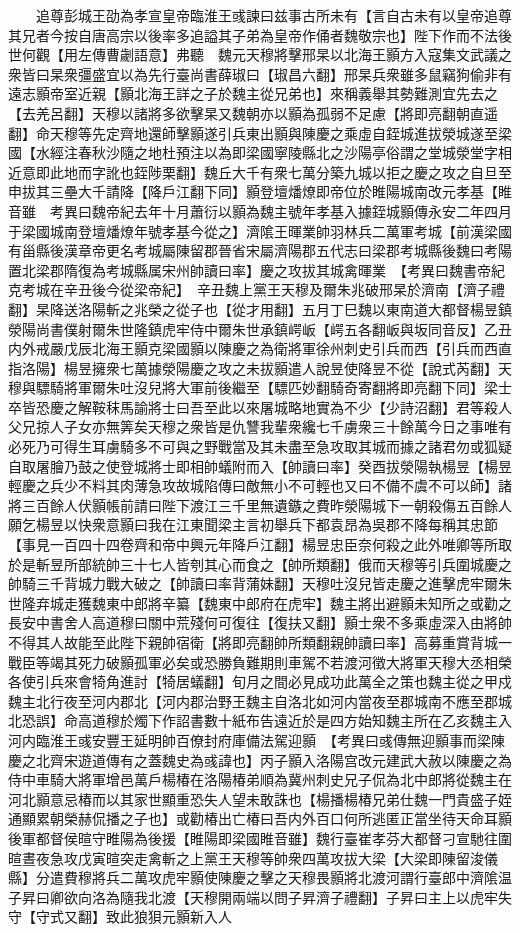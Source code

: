 　　追尊彭城王劭為孝宣皇帝臨淮王彧諫曰兹事古所未有【言自古未有以皇帝追尊其兄者今按自唐高宗以後率多追謚其子弟為皇帝作俑者魏敬宗也】陛下作而不法後世何觀【用左傳曹劌語意】弗聽　魏元天穆將擊邢杲以北海王顥方入寇集文武議之衆皆曰杲衆彊盛宜以為先行臺尚書薛琡曰【琡昌六翻】邢杲兵衆雖多鼠竊狗偷非有遠志顥帝室近親【顥北海王詳之子於魏主從兄弟也】來稱義舉其勢難測宜先去之【去羌呂翻】天穆以諸將多欲擊杲又魏朝亦以顥為孤弱不足慮【將即亮翻朝直遥翻】命天穆等先定齊地還師擊顥遂引兵東出顥與陳慶之乘虛自銍城進拔滎城遂至梁國【水經注春秋沙隨之地杜預注以為即梁國寧陵縣北之沙陽亭俗謂之堂城滎堂字相近意即此地而字訛也銍陟栗翻】魏丘大千有衆七萬分築九城以拒之慶之攻之自旦至申拔其三壘大千請降【降戶江翻下同】顥登壇燔燎即帝位於睢陽城南改元孝基【睢音雖　考異曰魏帝紀去年十月蕭衍以顥為魏主號年孝基入據銍城顥傳永安二年四月于梁國城南登壇燔燎年號孝基今從之】濟隂王暉業帥羽林兵二萬軍考城【前漢梁國有甾縣後漢章帝更名考城屬陳留郡晉省宋屬濟陽郡五代志曰梁郡考城縣後魏曰考陽置北梁郡隋復為考城縣属宋州帥讀曰率】慶之攻拔其城禽暉業　【考異曰魏書帝紀克考城在辛丑後今從梁帝紀】　辛丑魏上黨王天穆及爾朱兆破邢杲於濟南【濟子禮翻】杲降送洛陽斬之兆榮之從子也【從才用翻】五月丁巳魏以東南道大都督楊昱鎮滎陽尚書僕射爾朱世隆鎮虎牢侍中爾朱世承鎮崿岅【崿五各翻岅與坂同音反】乙丑内外戒嚴戊辰北海王顥克梁國顥以陳慶之為衛將軍徐州刺史引兵而西【引兵而西直指洛陽】楊昱擁衆七萬據滎陽慶之攻之未拔顥遣人說昱使降昱不從【說式芮翻】天穆與驃騎將軍爾朱吐沒兒將大軍前後繼至【驃匹妙翻騎奇寄翻將即亮翻下同】梁士卒皆恐慶之解鞍秣馬諭將士曰吾至此以來屠城略地實為不少【少詩沼翻】君等殺人父兄掠人子女亦無筭矣天穆之衆皆是仇讐我輩衆纔七千虜衆三十餘萬今日之事唯有必死乃可得生耳虜騎多不可與之野戰當及其未盡至急攻取其城而據之諸君勿或狐疑自取屠膾乃鼓之使登城將士即相帥蟻附而入【帥讀曰率】癸酉拔滎陽執楊昱【楊昱輕慶之兵少不料其肉薄急攻故城陷傳曰敵無小不可輕也又曰不備不虞不可以師】諸將三百餘人伏顥帳前請曰陛下渡江三千里無遺鏃之費昨滎陽城下一朝殺傷五百餘人願乞楊昱以快衆意顥曰我在江東聞梁主言初舉兵下都袁昂為吳郡不降每稱其忠節【事見一百四十四卷齊和帝中興元年降戶江翻】楊昱忠臣奈何殺之此外唯卿等所取於是斬昱所部統帥三十七人皆刳其心而食之【帥所類翻】俄而天穆等引兵圍城慶之帥騎三千背城力戰大破之【帥讀曰率背蒲妹翻】天穆吐沒兒皆走慶之進擊虎牢爾朱世隆弃城走獲魏東中郎將辛纂【魏東中郎府在虎牢】魏主將出避顥未知所之或勸之長安中書舍人高道穆曰關中荒殘何可復往【復扶又翻】顥士衆不多乘虛深入由將帥不得其人故能至此陛下親帥宿衛【將即亮翻帥所類翻親帥讀曰率】高募重賞背城一戰臣等竭其死力破顥孤軍必矣或恐勝負難期則車駕不若渡河徵大將軍天穆大丞相榮各使引兵來會犄角進討【犄居蟻翻】旬月之間必見成功此萬全之策也魏主從之甲戍魏主北行夜至河内郡北【河内郡治野王魏主自洛北如河内當夜至郡城南不應至郡城北恐誤】命高道穆於燭下作詔書數十紙布告遠近於是四方始知魏主所在乙亥魏主入河内臨淮王彧安豐王延明帥百僚封府庫備法駕迎顥　【考異曰彧傳無迎顥事而梁陳慶之北齊宋遊道傳有之蓋魏史為彧諱也】丙子顥入洛陽宫改元建武大赦以陳慶之為侍中車騎大將軍增邑萬戶楊椿在洛陽椿弟順為冀州刺史兄子侃為北中郎將從魏主在河北顥意忌椿而以其家世顯重恐失人望未敢誅也【楊播楊椿兄弟仕魏一門貴盛子姪通顯累朝榮赫侃播之子也】或勸椿出亡椿曰吾内外百口何所逃匿正當坐待天命耳顥後軍都督侯暄守睢陽為後援【睢陽即梁國睢音雖】魏行臺崔孝芬大都督刁宣馳往圍暄晝夜急攻戊寅暄突走禽斬之上黨王天穆等帥衆四萬攻拔大梁【大梁即陳留浚儀縣】分遣費穆將兵二萬攻虎牢顥使陳慶之擊之天穆畏顥將北渡河謂行臺郎中濟隂温子昇曰卿欲向洛為隨我北渡【天穆開兩端以問子昇濟子禮翻】子昇曰主上以虎牢失守【守式又翻】致此狼狽元顥新入人
